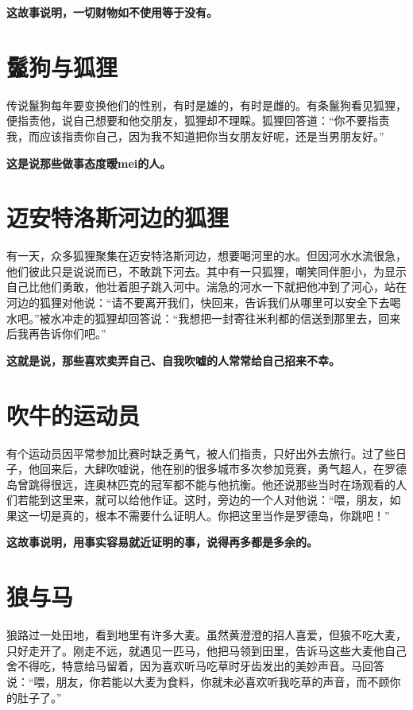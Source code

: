 {\bfseries \color{red}这故事说明，一切财物如不使用等于没有。}

\section{鬣狗与狐狸}

传说鬣狗每年要变换他们的性别，有时是雄的，有时是雌的。有条鬣狗看见狐狸，便指责他，说自己想要和他交朋友，狐狸却不理睬。狐狸回答道：“你不要指责我，而应该指责你自己，因为我不知道把你当女朋友好呢，还是当男朋友好。”

{\bfseries \color{red}这是说那些做事态度暧mei的人。}

\section{迈安特洛斯河边的狐狸}

有一天，众多狐狸聚集在迈安特洛斯河边，想要喝河里的水。但因河水水流很急，他们彼此只是说说而已，不敢跳下河去。其中有一只狐狸，嘲笑同伴胆小，为显示自己比他们勇敢，他壮着胆子跳入河中。湍急的河水一下就把他冲到了河心，站在河边的狐狸对他说：“请不要离开我们，快回来，告诉我们从哪里可以安全下去喝水吧。”被水冲走的狐狸却回答说：“我想把一封寄往米利都的信送到那里去，回来后我再告诉你们吧。”

{\bfseries \color{red}这就是说，那些喜欢卖弄自己、自我吹嘘的人常常给自己招来不幸。}

\section{吹牛的运动员}

有个运动员因平常参加比赛时缺乏勇气，被人们指责，只好出外去旅行。过了些日子，他回来后，大肆吹嘘说，他在别的很多城市多次参加竞赛，勇气超人，在罗德岛曾跳得很远，连奥林匹克的冠军都不能与他抗衡。他还说那些当时在场观看的人们若能到这里来，就可以给他作证。这时，旁边的一个人对他说：“喂，朋友，如果这一切是真的，根本不需要什么证明人。你把这里当作是罗德岛，你跳吧！”

{\bfseries \color{red}这故事说明，用事实容易就近证明的事，说得再多都是多余的。}

\section{狼与马}

狼路过一处田地，看到地里有许多大麦。虽然黄澄澄的招人喜爱，但狼不吃大麦，只好走开了。刚走不远，就遇见一匹马，他把马领到田里，告诉马这些大麦他自己舍不得吃，特意给马留着，因为喜欢听马吃草时牙齿发出的美妙声音。马回答说：“喂，朋友，你若能以大麦为食料，你就未必喜欢听我吃草的声音，而不顾你的肚子了。”

